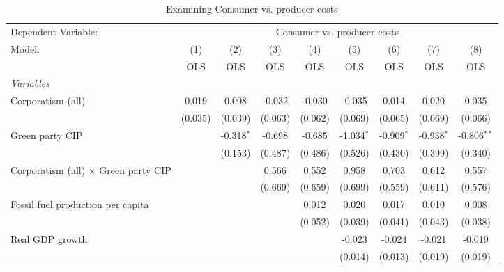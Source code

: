 
\begin{table}[htbp]
   \caption{Examining Consumer vs. producer costs}
   \centering
   \begin{tabular}{lcccccccc}
      \toprule
      Dependent Variable: & \multicolumn{8}{c}{Consumer vs. producer costs}\\
      Model:                                      & (1)     & (2)          & (3)     & (4)     & (5)          & (6)          & (7)          & (8)\\  
                                                  &  OLS    & OLS          & OLS     & OLS     & OLS          & OLS          & OLS          & OLS\\  
      \midrule
      \emph{Variables}\\
      Corporatism (all)                           & 0.019   & 0.008        & -0.032  & -0.030  & -0.035       & 0.014        & 0.020        & 0.035\\   
                                                  & (0.035) & (0.039)      & (0.063) & (0.062) & (0.069)      & (0.065)      & (0.069)      & (0.066)\\   
      Green party CIP                             &         & -0.318$^{*}$ & -0.698  & -0.685  & -1.034$^{*}$ & -0.909$^{*}$ & -0.938$^{*}$ & -0.806$^{**}$\\   
                                                  &         & (0.153)      & (0.487) & (0.486) & (0.526)      & (0.430)      & (0.399)      & (0.340)\\   
      Corporatism (all) $\times$ Green party CIP  &         &              & 0.566   & 0.552   & 0.958        & 0.703        & 0.612        & 0.557\\   
                                                  &         &              & (0.669) & (0.659) & (0.699)      & (0.559)      & (0.611)      & (0.576)\\   
      Fossil fuel production per capita           &         &              &         & 0.012   & 0.020        & 0.017        & 0.010        & 0.008\\   
                                                  &         &              &         & (0.052) & (0.039)      & (0.041)      & (0.043)      & (0.038)\\   
      Real GDP growth                             &         &              &         &         & -0.023       & -0.024       & -0.021       & -0.019\\   
                                                  &         &              &         &         & (0.014)      & (0.013)      & (0.019)      & (0.019)\\   

\end{tabular}
\end{table}
